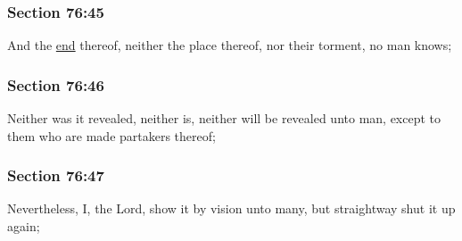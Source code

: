 	\subsubsection{Section 76:45} %
		\label{DC76-45}

		And the \hyperref[END]{end} thereof, neither the place thereof, nor their torment, no man knows;


	\subsubsection{Section 76:46} %
		\label{DC76-46}

		Neither was it revealed, neither is, neither will be revealed unto man, except to them who are made partakers thereof;


	\subsubsection{Section 76:47} %
		\label{DC76-47}

		Nevertheless, I, the Lord, show it by vision unto many, but straightway shut it up again;


